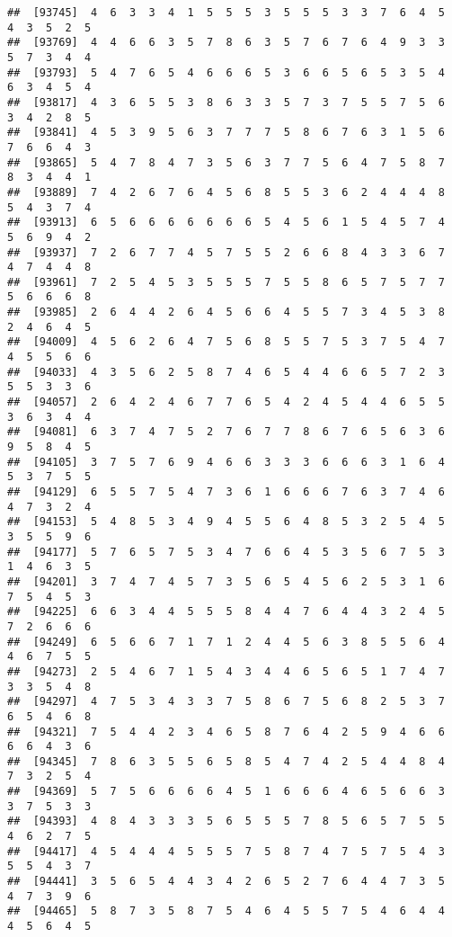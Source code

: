 \documentclass[
]{book}
\begin{document}
\begin{verbatim}
##  [93745]  4  6  3  3  4  1  5  5  5  3  5  5  5  3  3  7  6  4  5  4  3  5  2  5
##  [93769]  4  4  6  6  3  5  7  8  6  3  5  7  6  7  6  4  9  3  3  5  7  3  4  4
##  [93793]  5  4  7  6  5  4  6  6  6  5  3  6  6  5  6  5  3  5  4  6  3  4  5  4
##  [93817]  4  3  6  5  5  3  8  6  3  3  5  7  3  7  5  5  7  5  6  3  4  2  8  5
##  [93841]  4  5  3  9  5  6  3  7  7  7  5  8  6  7  6  3  1  5  6  7  6  6  4  3
##  [93865]  5  4  7  8  4  7  3  5  6  3  7  7  5  6  4  7  5  8  7  8  3  4  4  1
##  [93889]  7  4  2  6  7  6  4  5  6  8  5  5  3  6  2  4  4  4  8  5  4  3  7  4
##  [93913]  6  5  6  6  6  6  6  6  6  5  4  5  6  1  5  4  5  7  4  5  6  9  4  2
##  [93937]  7  2  6  7  7  4  5  7  5  5  2  6  6  8  4  3  3  6  7  4  7  4  4  8
##  [93961]  7  2  5  4  5  3  5  5  5  7  5  5  8  6  5  7  5  7  7  5  6  6  6  8
##  [93985]  2  6  4  4  2  6  4  5  6  6  4  5  5  7  3  4  5  3  8  2  4  6  4  5
##  [94009]  4  5  6  2  6  4  7  5  6  8  5  5  7  5  3  7  5  4  7  4  5  5  6  6
##  [94033]  4  3  5  6  2  5  8  7  4  6  5  4  4  6  6  5  7  2  3  5  5  3  3  6
##  [94057]  2  6  4  2  4  6  7  7  6  5  4  2  4  5  4  4  6  5  5  3  6  3  4  4
##  [94081]  6  3  7  4  7  5  2  7  6  7  7  8  6  7  6  5  6  3  6  9  5  8  4  5
##  [94105]  3  7  5  7  6  9  4  6  6  3  3  3  6  6  6  3  1  6  4  5  3  7  5  5
##  [94129]  6  5  5  7  5  4  7  3  6  1  6  6  6  7  6  3  7  4  6  4  7  3  2  4
##  [94153]  5  4  8  5  3  4  9  4  5  5  6  4  8  5  3  2  5  4  5  3  5  5  9  6
##  [94177]  5  7  6  5  7  5  3  4  7  6  6  4  5  3  5  6  7  5  3  1  4  6  3  5
##  [94201]  3  7  4  7  4  5  7  3  5  6  5  4  5  6  2  5  3  1  6  7  5  4  5  3
##  [94225]  6  6  3  4  4  5  5  5  8  4  4  7  6  4  4  3  2  4  5  7  2  6  6  6
##  [94249]  6  5  6  6  7  1  7  1  2  4  4  5  6  3  8  5  5  6  4  4  6  7  5  5
##  [94273]  2  5  4  6  7  1  5  4  3  4  4  6  5  6  5  1  7  4  7  3  3  5  4  8
##  [94297]  4  7  5  3  4  3  3  7  5  8  6  7  5  6  8  2  5  3  7  6  5  4  6  8
##  [94321]  7  5  4  4  2  3  4  6  5  8  7  6  4  2  5  9  4  6  6  6  6  4  3  6
##  [94345]  7  8  6  3  5  5  6  5  8  5  4  7  4  2  5  4  4  8  4  7  3  2  5  4
##  [94369]  5  7  5  6  6  6  6  4  5  1  6  6  6  4  6  5  6  6  3  3  7  5  3  3
##  [94393]  4  8  4  3  3  3  5  6  5  5  5  7  8  5  6  5  7  5  5  4  6  2  7  5
##  [94417]  4  5  4  4  4  5  5  5  7  5  8  7  4  7  5  7  5  4  3  5  5  4  3  7
##  [94441]  3  5  6  5  4  4  3  4  2  6  5  2  7  6  4  4  7  3  5  4  7  3  9  6
##  [94465]  5  8  7  3  5  8  7  5  4  6  4  5  5  7  5  4  6  4  4  4  5  6  4  5

\end{verbatim}
\end{document}
